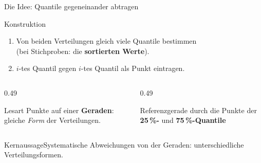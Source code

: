 \documentclass[aspectratio=169,11pt]{beamer}
\newcommand{\kernaussage}[1]{\begin{alertblock}{Kernaussage}#1\end{alertblock}}
\begin{document}
\begin{frame}{Die Idee: Quantile gegeneinander abtragen}
  \begin{block}{Konstruktion}
    \begin{enumerate}
      \item Von beiden Verteilungen gleich viele Quantile bestimmen\\
            (bei Stichproben: die \textbf{sortierten Werte}).
      \item $i$-tes Quantil gegen $i$-tes Quantil als Punkt eintragen.
    \end{enumerate}
  \end{block}

  \medskip

  \begin{columns}[T]
    \begin{column}{0.49\textwidth}
      \begin{exampleblock}{Lesart}
        Punkte auf einer \textbf{Geraden}: gleiche \emph{Form} der Verteilungen.
      \end{exampleblock}
    \end{column}
    \begin{column}{0.49\textwidth}
      \begin{block}{Referenzgerade}
        durch die Punkte der \textbf{25\,\%-} und \textbf{75\,\%-Quantile}
      \end{block}
    \end{column}
  \end{columns}

  \medskip

  \kernaussage{Systematische Abweichungen von der Geraden: unterschiedliche
    Verteilungsformen.}
\end{frame}
\end{document}
